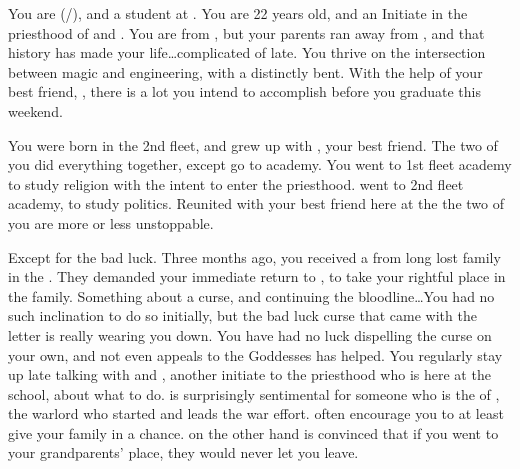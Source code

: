 \documentclass[char]{GL2020}
\begin{document}
\name{\cInitiate{}}



You are \cInitiate{\full} (\cInitiate{\they}/\cInitiate{\them}), and a student at \pSchool{}. You are 22 years old, and an Initiate in the priesthood of \cEbb{} and \cFlow{}. You are from \pShip{}, but your parents ran away from \pFarm{}, and that history has made your life\ldots complicated of late. You thrive on the intersection between magic and engineering, with a distinctly \pShip{} bent. With the help of your best friend, \cPresident{\full}, there is a lot you intend to accomplish before you graduate this weekend.

You were born in the 2nd fleet, and grew up with \cPresident{}, your best friend. The two of you did everything together, except go to academy. You went to 1st fleet academy to study religion with the intent to enter the priesthood. \cPresident{\They} went to 2nd fleet academy, to study politics. Reunited with your best friend here at the \pSchool{} the two of you are more or less unstoppable. 

Except for the bad luck. Three months ago, you received a \iCursedLetter{} from long lost family in the \pFarm{}. They demanded your immediate return to \pFarm{}, to take your rightful place in the family. Something about a curse, and continuing the bloodline\ldots You had no such inclination to do so initially, but the bad luck curse that came with the letter is really wearing you down. You have had no luck dispelling the curse on your own, and not even appeals to the Goddesses has helped. You regularly stay up late talking with \cPresident{} and \cWarlordDaughter{}, another initiate to the priesthood who is here at the school, about what to do. \cWarlordDaughter{} is surprisingly sentimental for someone who is the \cWarlordDaughter{\child} of \cLoud{\full}, the warlord who started and leads the \pShip{} war effort. \cWarlordDaughter{\They} often encourage\cWarlordDaughter{\plural} you to at least give your family in \pFarm{} a chance. \cPresident{} on the other hand is convinced that if you went to your grandparents' place, they would never let you leave.
\end{document}
